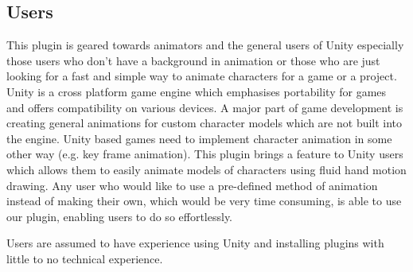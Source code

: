\subsection{Users}
This plugin is geared towards animators and the general users of Unity especially those users who don't have a background in animation or those who are just looking for a fast and simple way to animate characters for a game or a project. Unity is a cross platform game engine which emphasises portability for games and offers compatibility on various devices. A major part of game development is creating general animations for custom character models which are not built into the engine. Unity based games need to implement character animation in some other way (e.g. key frame animation). This plugin brings a feature to Unity users which allows them to easily animate models of characters using fluid hand motion drawing. Any user who would like to use a pre-defined method of animation instead of making their own, which would be very time consuming, is able to use our plugin, enabling users to do so effortlessly.

Users are assumed to have experience using Unity and installing plugins with little to no technical experience.
